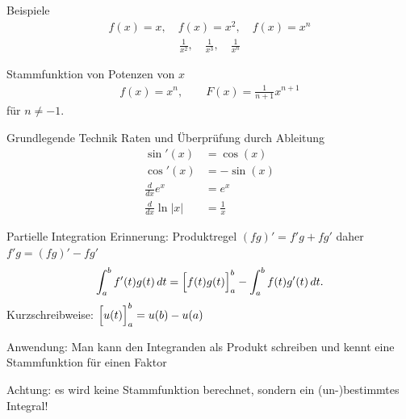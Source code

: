 \begin{frame}{Beispiele}
    \begin{gather*}
        f(x) = x,\quad f(x) = x^2, \quad f(x) = x^n
    \end{gather*}
    \pause
    \begin{gather*}
        \frac1{x^2},\quad \frac1{x^3},\quad \frac1{x^n}
    \end{gather*}
    \pause
    \begin{block}{Stammfunktion von Potenzen von $x$}
    \begin{gather*}
        f(x) = x^n,
        \qquad
        F(x) = \tfrac1{n+1}x^{n+1}
    \end{gather*}
    für $n\neq -1$.
    \end{block}
\end{frame}

\begin{frame}{Grundlegende Technik}
    Raten und Überprüfung durch Ableitung
    \begin{align*}
        \sin'(x) &= \cos(x)\\
        \cos'(x) &= -\sin(x)\\
        \tfrac{d}{dx} e^x &= e^x\\
        \tfrac{d}{dx} \ln \left|x\right| &= \tfrac1x
    \end{align*}
\end{frame}

\begin{frame}{Partielle Integration}
    Erinnerung: Produktregel $(fg)' = f'g+fg'$ daher $f'g = (fg)'-fg'$
    \pause
    \begin{gather*}
        \int_a^b f'(t)g(t)\,dt = \Bigl[f(t)g(t)\Bigr]_a^b
        -\int_a^b f(t)g'(t)\,dt.
    \end{gather*}
    Kurzschreibweise: $\Bigl[u(t)\Bigr]_a^b = u(b)-u(a)$

    Anwendung: Man kann den Integranden als Produkt schreiben und kennt eine Stammfunktion für einen Faktor

    \pause
    Achtung: es wird keine Stammfunktion berechnet, sondern ein (un-)bestimmtes Integral!
\end{frame}

